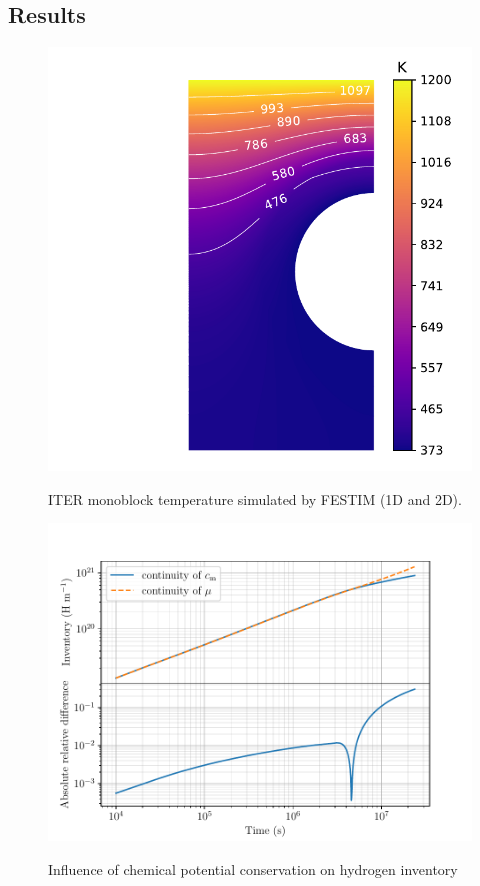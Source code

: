 \subsection{Results}
\begin{figure}
    \centering
    \includegraphics[width=\linewidth]{Figures/Chapter3/monoblocks/interface_condition/iter case/temperature_field_2d.pdf}
    \label{fig: 2D temperature}
    \caption{ITER monoblock temperature simulated by FESTIM (1D and 2D).}
\end{figure}

\begin{figure}
    \centering
    \includegraphics[width=\linewidth]{Figures/Chapter3/monoblocks/interface_condition/iter case/comparison_inventory_2d.pdf}
    \label{fig: 2D inventories}
    \caption{Influence of chemical potential conservation on hydrogen inventory}
\end{figure}

